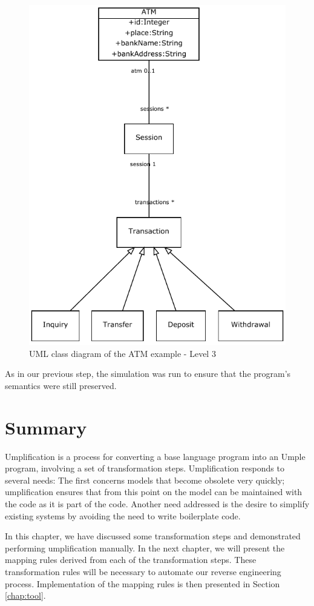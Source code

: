 \begin{figure}[!ht]
\centering
\includegraphics{Figures/Example2a3.pdf} 
\caption{UML class diagram of the ATM example - Level 3}
\label{fig:atmBanking3}
\end{figure}

As in our previous step, the simulation was run to ensure that the program's semantics were still preserved.


\section{Summary}

Umplification is a process for converting a base language program into an Umple program, involving a set of transformation steps. Umplification responds to several needs: The first concerns models that become obsolete very quickly; umplification ensures that from this point on the model can be maintained with the code as it is part of the code. Another need addressed is the desire to simplify existing systems by avoiding the need to write boilerplate code.

In this chapter, we have discussed some transformation steps and demonstrated performing umplification manually. In the next chapter, we will present the mapping rules derived from each of the transformation steps. These transformation rules will be necessary to automate our reverse engineering process. Implementation of the mapping rules is then presented in Section \ref{chap:tool}.
